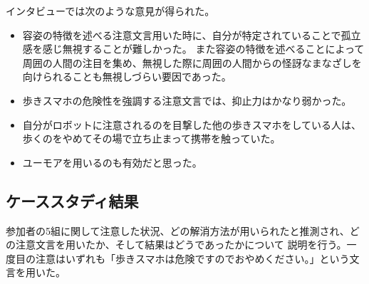 \documentclass{kuisthesis}
\begin{document}
インタビューでは次のような意見が得られた。
\begin{itemize}
  \item 容姿の特徴を述べる注意文言用いた時に、自分が特定されていることで孤立感を感じ無視することが難しかった。
        また容姿の特徴を述べることによって周囲の人間の注目を集め、無視した際に周囲の人間からの怪訝なまなざしを向けられることも無視しづらい要因であった。
  \item 歩きスマホの危険性を強調する注意文言では、抑止力はかなり弱かった。
  \item 自分がロボットに注意されるのを目撃した他の歩きスマホをしている人は、歩くのをやめてその場で立ち止まって携帯を触っていた。
  \item ユーモアを用いるのも有効だと思った。
\end{itemize}
\subsection{ケーススタディ結果}
参加者の5組に関して注意した状況、どの解消方法が用いられたと推測され、どの注意文言を用いたか、そして結果はどうであったかについて
説明を行う。一度目の注意はいずれも「歩きスマホは危険ですのでおやめください。」という文言を用いた。
\end{document}
